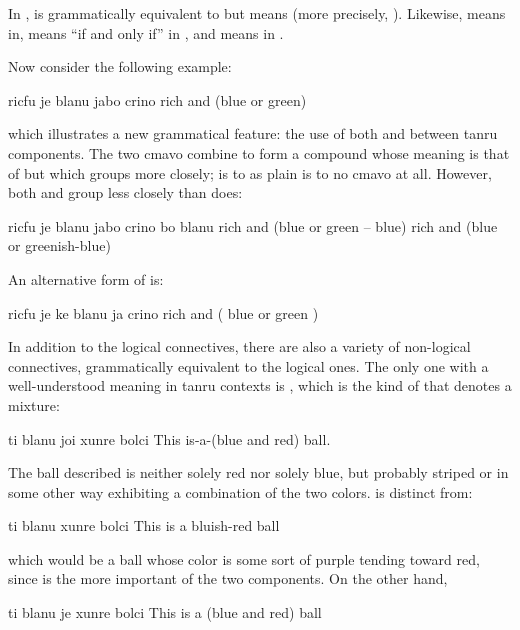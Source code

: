 In ,  is
    grammatically equivalent to  but means  (more
    precisely, ). Likewise,  means  in,  means ``if and only
    if'' in , and  means
     in .

Now consider the following example:
\begin{example}
ricfu je blanu jabo crino\n
rich and (blue or green)
\end{example}

{\noindent}which illustrates a new grammatical feature: the use of both
     and  between tanru components. The two cmavo
    combine to form a compound whose meaning is that of  but
    which groups more closely;  is to  as plain
     is to no cmavo at all. However, both  and 
    group less closely than  does:
\begin{example}
ricfu je blanu jabo crino bo blanu\n
rich and (blue or green -- blue)\n
rich and (blue or greenish-blue)
\end{example}

An alternative form of 
    is:
\begin{example}
ricfu je ke blanu ja crino \n
rich and ( blue or green )
\end{example}

In addition to the logical connectives, there are also a
    variety of non-logical connectives, grammatically equivalent to
    the logical ones. The only one with a well-understood meaning
    in tanru contexts is , which is the kind of  that
    denotes a mixture:
\begin{example}
ti blanu joi xunre bolci\n
This is-a-(blue and red) ball.
\end{example}

The ball described is neither solely red nor solely blue,
    but probably striped or in some other way exhibiting a
    combination of the two colors.  is distinct from:
\begin{example}
ti blanu xunre bolci\n
This is a bluish-red ball
\end{example}

{\noindent}which would be a ball whose color is some sort of purple
    tending toward red, since  is the more important of
    the two components. On the other hand,
\begin{example}
ti blanu je xunre bolci\n
This is a (blue and red) ball
\end{example}

